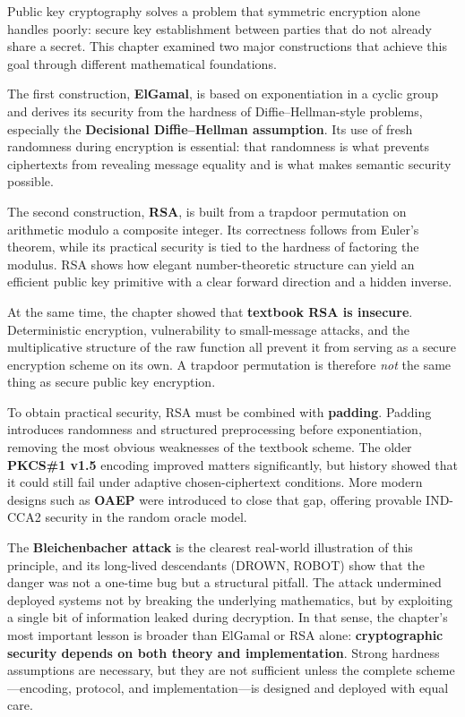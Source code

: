 Public key cryptography solves a problem that symmetric encryption alone handles poorly: secure key establishment between parties that do not already share a secret. This chapter examined two major constructions that achieve this goal through different mathematical foundations.

The first construction, \textbf{ElGamal}, is based on exponentiation in a cyclic group and derives its security from the hardness of Diffie--Hellman-style problems, especially the \textbf{Decisional Diffie--Hellman assumption}. Its use of fresh randomness during encryption is essential: that randomness is what prevents ciphertexts from revealing message equality and is what makes semantic security possible.

The second construction, \textbf{RSA}, is built from a trapdoor permutation on arithmetic modulo a composite integer. Its correctness follows from Euler's theorem, while its practical security is tied to the hardness of factoring the modulus. RSA shows how elegant number-theoretic structure can yield an efficient public key primitive with a clear forward direction and a hidden inverse.

At the same time, the chapter showed that \textbf{textbook RSA is insecure}. Deterministic encryption, vulnerability to small-message attacks, and the multiplicative structure of the raw function all prevent it from serving as a secure encryption scheme on its own. A trapdoor permutation is therefore \emph{not} the same thing as secure public key encryption.

To obtain practical security, RSA must be combined with \textbf{padding}. Padding introduces randomness and structured preprocessing before exponentiation, removing the most obvious weaknesses of the textbook scheme. The older \textbf{PKCS\#1 v1.5} encoding improved matters significantly, but history showed that it could still fail under adaptive chosen-ciphertext conditions. More modern designs such as \textbf{OAEP} were introduced to close that gap, offering provable IND-CCA2 security in the random oracle model.

The \textbf{Bleichenbacher attack} is the clearest real-world illustration of this principle, and its long-lived descendants (DROWN, ROBOT) show that the danger was not a one-time bug but a structural pitfall. The attack undermined deployed systems not by breaking the underlying mathematics, but by exploiting a single bit of information leaked during decryption. In that sense, the chapter's most important lesson is broader than ElGamal or RSA alone: \textbf{cryptographic security depends on both theory and implementation}. Strong hardness assumptions are necessary, but they are not sufficient unless the complete scheme---encoding, protocol, and implementation---is designed and deployed with equal care.
